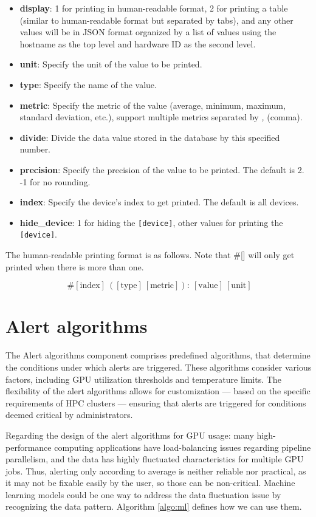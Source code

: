\begin{itemize}
    \item \textbf{display}: 1 for printing in human-readable format, 2 for printing a table (similar to human-readable format but separated by tabs), and any other values will be in JSON format organized by a list of values using the hostname as the top level and hardware ID as the second level.
    \item \textbf{unit}: Specify the unit of the value to be printed.
    \item \textbf{type}: Specify the name of the value.
    \item \textbf{metric}: Specify the metric of the value (average, minimum, maximum, standard deviation, etc.), support multiple metrics separated by \textit{,} (comma).
    \item \textbf{divide}: Divide the data value stored in the database by this specified number.
    \item \textbf{precision}: Specify the precision of the value to be printed. The default is 2. -1 for no rounding.
    \item \textbf{index}: Specify the device's index to get printed. The default is all devices.
    \item \textbf{hide\_device}: 1 for hiding the \texttt{[device]}, other values for printing the \texttt{[device]}.
\end{itemize}

The human-readable printing format is as follows. Note that \#[] will only get printed when there is more than one.

\begin{equation*}
[\text{device}]~\#[\text{index}]~([\text{type}] \ [\text{metric}]):~[\text{value}] \ [\text{unit}]
\end{equation*}


\section{Alert algorithms}
The Alert algorithms component comprises predefined algorithms, that determine the conditions under which alerts are triggered. These algorithms consider various factors, including GPU utilization thresholds and temperature limits. The flexibility of the alert algorithms allows for customization --- based on the specific requirements of HPC clusters --- ensuring that alerts are triggered for conditions deemed critical by administrators.

Regarding the design of the alert algorithms for GPU usage: many high-performance computing applications have load-balancing issues regarding pipeline parallelism, and the data has highly fluctuated characteristics for multiple GPU jobs. Thus, alerting only according to average is neither reliable nor practical, as it may not be fixable easily by the user, so those can be non-critical. Machine learning models could be one way to address the data fluctuation issue by recognizing the data pattern. Algorithm \ref{algo:ml} defines how we can use them.

